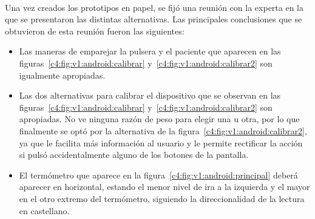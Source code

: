 \paragraph{}
Una vez creados los prototipos en papel, se fijó una reunión con la experta en la que se presentaron las distintas alternativas. Las principales conclusiones que se obtuvieron de esta reunión fueron las siguientes:
\begin{itemize}
    \item Las maneras de emparejar la pulsera y el paciente que aparecen en las figuras~\ref{c4:fig:v1:android:calibrar} y~\ref{c4:fig:v1:android:calibrar2} son igualmente apropiadas.
    \item Las dos alternativas para calibrar el dispositivo que se observan en las figuras~\ref{c4:fig:v1:android:calibrar} y~\ref{c4:fig:v1:android:calibrar2} son apropiadas. No ve ninguna razón de peso para elegir una u otra, por lo que finalmente se optó por la alternativa de la figura~\ref{c4:fig:v1:android:calibrar2}, ya que le facilita más información al usuario y le permite rectificar la acción si pulsó accidentalmente alguno de los botones de la pantalla.
    \item El termómetro que aparece en la figura~\ref{c4:fig:v1:android:principal} deberá aparecer en horizontal, estando el menor nivel de ira a la izquierda y el mayor en el otro extremo del termómetro, siguiendo la direccionalidad de la lectura en castellano.


\end{itemize}
